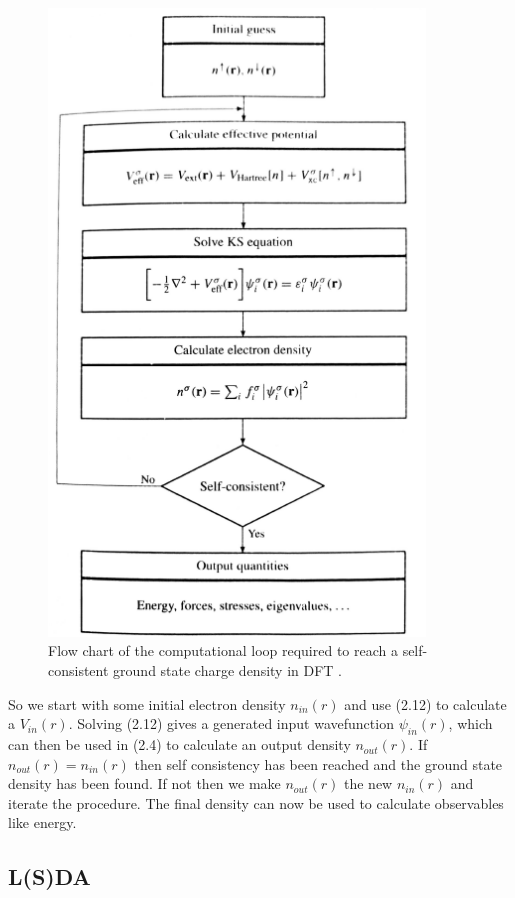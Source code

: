 \documentclass[12pt]{article}
\begin{document}
\begin{figure}[htp]
    \centering
    \begin{measuredfigure}
    \includegraphics[width=10cm]{loop}
    \caption{Flow chart of the computational loop required to reach a self-consistent ground state charge density in DFT \cite{martin}.}
    \end{measuredfigure}
    \end{figure}

So we start with some initial electron density $n_{in}(r)$ and use (2.12) to calculate a $V_{in}(r)$. Solving (2.12) gives a generated input wavefunction $\psi_{in}(r)$, which can then be used in (2.4) to calculate an output density $n_{out}(r)$. If $n_{out}(r)=n_{in}(r)$ then self consistency has been reached and the ground state density has been found. If not then we make $n_{out}(r)$ the new $n_{in}(r)$ and iterate the procedure. The final density can now be used to calculate observables like energy.

\subsection{L(S)DA}
\end{document}
